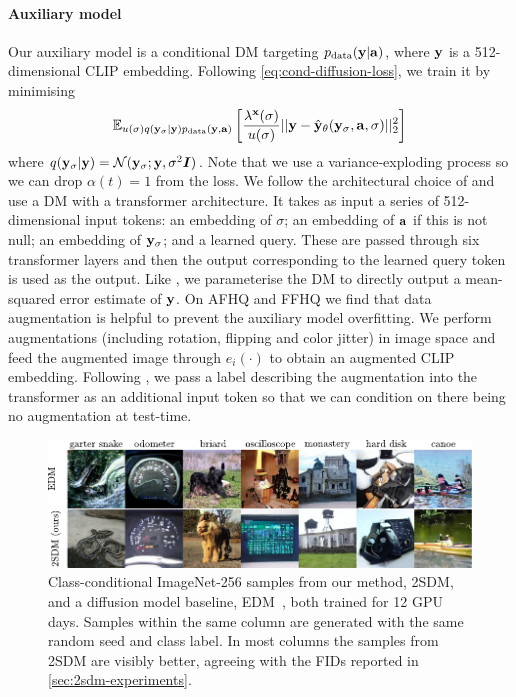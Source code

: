 \paragraph{Auxiliary model}
Our auxiliary model is a conditional DM targeting $p_{\rm{data}}({\mathbf{y}}|{\mathbf{a}})$, where ${\mathbf{y}}$ is a 512-dimensional CLIP embedding. Following \cref{eq:cond-diffusion-loss}, we train it by minimising
\begin{equation}
\label{eq:auxiliary-model-objective}
    \mathbb{E}_{u(\sigma)q({\mathbf{y}}_\sigma|{\mathbf{y}})p_{\rm{data}}({\mathbf{y}},{\mathbf{a}})} \left[ \frac{\lambda^{\mathbf{x}}(\sigma)}{u(\sigma)} \lvert\lvert {\mathbf{y}} - \hat{{\mathbf{y}}}_\theta({\mathbf{y}}_\sigma, {\mathbf{a}}, \sigma) \rvert\rvert_2^2 \right]
\end{equation}
where $q({\mathbf{y}}_\sigma|{\mathbf{y}}) = {\mathcal{N}}({\mathbf{y}}_\sigma; {\mathbf{y}}, \sigma^2{\bm{I}})$. Note that we use a variance-exploding process so we can drop $\alpha(t) = 1$ from the loss. We follow the architectural choice of \citet{ramesh2022hierarchical} and use a DM with a transformer architecture. It takes as input a series of 512-dimensional input tokens: an embedding of $\sigma$; an embedding of ${\mathbf{a}}$ if this is not null; an embedding of ${\mathbf{y}}_\sigma$; and a learned query. These are passed through six transformer layers and then the output corresponding to the learned query token is used as the output. Like \citet{ramesh2022hierarchical}, we parameterise the DM to directly output a mean-squared error estimate of ${\mathbf{y}}$.
%
On AFHQ and FFHQ we find that data augmentation is helpful to prevent the auxiliary model overfitting. We perform augmentations (including rotation, flipping and color jitter) in image space and feed the augmented image through $e_i(\cdot)$ to obtain an augmented CLIP embedding. Following \citet{karras2022elucidating}, we pass a label describing the augmentation into the transformer as an additional input token so that we can condition on there being no augmentation at test-time.

\begin{figure}[t]
    \includegraphics[width=\textwidth]{figs/2sdm/2SDM-main-fig.pdf}
    \caption{Class-conditional ImageNet-256 samples from our method, 2SDM, and a diffusion model baseline, EDM~\citep{karras2022elucidating}, both trained for 12 GPU days. Samples within the same column are generated with the same random seed and class label. In most columns the samples from 2SDM are visibly better, agreeing with the FIDs reported in \cref{sec:2sdm-experiments}.}
    \label{fig:latent-imagenet-samples}
\end{figure}

